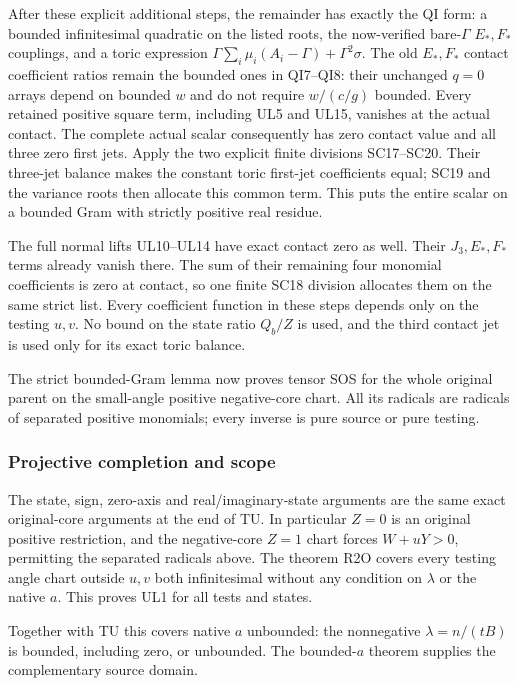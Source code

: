 After these explicit additional steps, the remainder has exactly
the QI form: a bounded infinitesimal quadratic on the listed
roots, the now-verified bare-$\Gamma$ $E_*,F_*$ couplings, and
a toric expression
$\Gamma\sum_i\mu_i(A_i-\Gamma)+\Gamma^2\sigma$.
The old $E_*,F_*$ contact coefficient ratios remain the bounded
ones in QI7--QI8: their unchanged $q=0$ arrays depend on bounded
$w$ and do not require $w/(c/g)$ bounded.
Every retained positive square term, including UL5 and UL15, vanishes at the
actual contact. The complete actual scalar consequently has zero
contact value and all three zero first jets. Apply the two
explicit finite divisions SC17--SC20. Their three-jet balance
makes the constant toric first-jet coefficients equal; SC19 and
the variance roots then allocate this common term. This puts
the entire scalar on a bounded Gram with strictly positive
real residue.

The full normal lifts UL10--UL14 have exact contact zero as well.
Their $J_3,E_*,F_*$ terms already vanish there. The sum of their
remaining four monomial coefficients is zero at contact, so one
finite SC18 division allocates them on the same strict list.
Every coefficient function in these steps depends only on the
testing $u,v$. No bound on the state ratio $Q_b/Z$ is used, and
the third contact jet is used only for its exact toric balance.

The strict bounded-Gram lemma now proves tensor SOS for the whole
original parent on the small-angle positive negative-core chart.
All its radicals are radicals of separated positive monomials;
every inverse is pure source or pure testing.

\subsubsection*{Projective completion and scope}

The state, sign, zero-axis and real/imaginary-state arguments are
the same exact original-core arguments at the end of TU.
In particular $Z=0$ is an original positive restriction, and the
negative-core $Z=1$ chart forces $W+uY>0$, permitting the
separated radicals above. The theorem R2O covers every testing
angle chart outside $u,v$ both infinitesimal without any
condition on $\lambda$ or the native $a$. This proves UL1 for
all tests and states.

Together with TU this covers native $a$ unbounded: the nonnegative
$\lambda=n/(tB)$ is bounded, including zero, or unbounded. The
bounded-$a$ theorem supplies the complementary source domain.

